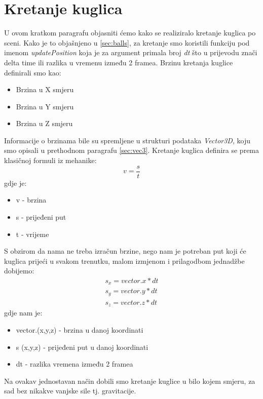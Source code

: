 \section{Kretanje kuglica}
U ovom kratkom paragrafu objasniti ćemo kako se realiziralo kretanje kuglica po sceni. Kako je to objašnjeno u \ref{sec:balls}, za kretanje smo koristili funkciju pod imenom \emph{updatePosition} koja je za argument primala broj \emph{dt} što u prijevodu znači delta time ili razlika u vremenu između 2 framea. 
Brzinu kretanja kuglice definirali smo kao:
\begin{itemize}
	\item Brzina u X smjeru
	\item Brzina u Y smjeru
	\item Brzina u Z smjeru
\end{itemize}
Informacije o brzinama bile su spremljene u strukturi podataka \emph{Vector3D}, koju smo opisali u prethodnom paragrafu \ref{sec:vec3}. Kretanje kuglica definira se prema klasičnoj formuli iz mehanike:
\begin{equation}
		v = \frac{s}{t} \label{equ:brzina}
\end{equation}
gdje je:
\begin{itemize}
	\item v - brzina
	\item s - prijeđeni put
	\item t - vrijeme 
\end{itemize}
S obzirom da nama ne treba izračun brzine, nego nam je potreban put koji će kuglica prijeći u svakom trenutku, malom izmjenom i prilagodbom jednadžbe dobijemo:
\begin{equation}\label{equ:put}
\begin{aligned}
	s_x = vector.x * dt\\
	s_y = vector.y * dt\\
	s_z = vector.z * dt
	\end{aligned}
\end{equation}
gdje nam je:
\begin{itemize}
	\item vector.(x,y,z) - brzina u danoj koordinati
	\item s (x,y,z) - prijeđeni put u danoj koordinati
	\item dt - razlika vremena između 2 framea
\end{itemize}
Na ovakav jednostavan način dobili smo kretanje kuglice u bilo kojem smjeru, za sad bez nikakve vanjske sile tj. gravitacije.
